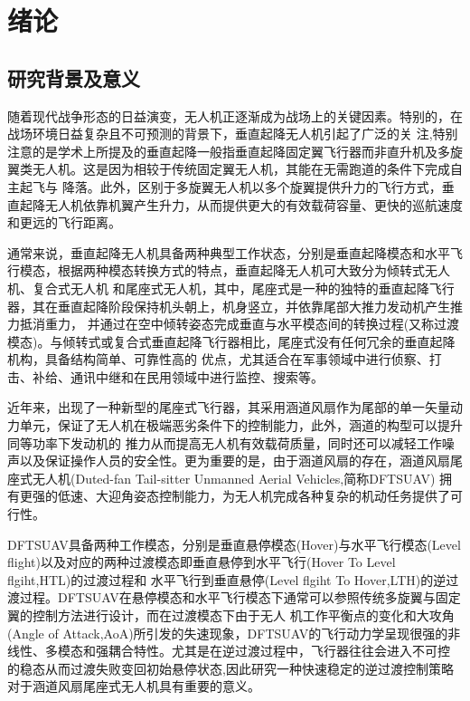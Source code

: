 \chapter{绪论}
\section{研究背景及意义}
随着现代战争形态的日益演变，无人机正逐渐成为战场上的关键因素。特别的，在战场环境日益复杂且不可预测的背景下，垂直起降无人机引起了广泛的关
注,特别注意的是学术上所提及的垂直起降一般指垂直起降固定翼飞行器而非直升机及多旋翼类无人机。这是因为相较于传统固定翼无人机，其能在无需跑道的条件下完成自主起飞与
降落。此外，区别于多旋翼无人机以多个旋翼提供升力的飞行方式，垂直起降无人机依靠机翼产生升力，从而提供更大的有效载荷容量、更快的巡航速度和更远的飞行距离\cite{okulski2022small}。

通常来说，垂直起降无人机具备两种典型工作状态，分别是垂直起降模态和水平飞行模态，根据两种模态转换方式的特点，垂直起降无人机可大致分为倾转式无人机、复合式无人机
和尾座式无人机，其中，尾座式是一种的独特的垂直起降飞行器，其在垂直起降阶段保持机头朝上，机身竖立，并依靠尾部大推力发动机产生推力抵消重力，
并通过在空中倾转姿态完成垂直与水平模态间的转换过程(又称过渡模态)。与倾转式或复合式垂直起降飞行器相比，尾座式没有任何冗余的垂直起降机构，具备结构简单、可靠性高的
优点，尤其适合在军事领域中进行侦察、打击、补给、通讯中继和在民用领域中进行监控、搜索等。

近年来，出现了一种新型的尾座式飞行器，其采用涵道风扇作为尾部的单一矢量动力单元，保证了无人机在极端恶劣条件下的控制能力，此外，涵道的构型可以提升同等功率下发动机的
推力从而提高无人机有效载荷质量，同时还可以减轻工作噪声以及保证操作人员的安全性。更为重要的是，由于涵道风扇的存在，涵道风扇尾座式无人机(Duted-fan Tail-sitter Unmanned Aerial Vehicles,简称DFTSUAV)
拥有更强的低速、大迎角姿态控制能力，为无人机完成各种复杂的机动任务提供了可行性。

DFTSUAV具备两种工作模态，分别是垂直悬停模态(Hover)与水平飞行模态(Level flight)以及对应的两种过渡模态即垂直悬停到水平飞行(Hover To Level flgiht,HTL)的过渡过程和
水平飞行到垂直悬停(Level flgiht To Hover,LTH)的逆过渡过程。DFTSUAV在悬停模态和水平飞行模态下通常可以参照传统多旋翼与固定翼的控制方法进行设计，而在过渡模态下由于无人
机工作平衡点的变化和大攻角(Angle of Attack,AoA)所引发的失速现象，DFTSUAV的飞行动力学呈现很强的非线性、多模态和强耦合特性。尤其是在逆过渡过程中，飞行器往往会进入不可控
的稳态从而过渡失败变回初始悬停状态,因此研究一种快速稳定的逆过渡控制策略对于涵道风扇尾座式无人机具有重要的意义。


